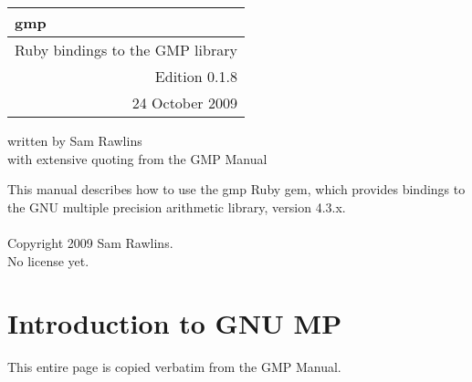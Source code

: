 \documentclass[pdftex,10pt]{article}
\newlength{\titrwidth}
\begin{document}
\begin{tabular}{p{1.0in} p{\titrwidth}}
\huge{gmp} &\\
\midrule[3pt]
\multicolumn{2}{r}{\large{Ruby bindings to the GMP library}}\\
\multicolumn{2}{r}{\large{Edition 0.1.8}}\\
\multicolumn{2}{r}{\large{24 October 2009}}
\end{tabular}

\vfill
\large{written by Sam Rawlins}\\
\large{with extensive quoting from the GMP Manual}
\newpage

\vfill
This manual describes how to use the gmp Ruby gem, which provides bindings to
the GNU multiple precision arithmetic library, version 4.3.x.\\
\\
Copyright 2009 Sam Rawlins.\\
No license yet.
\newpage

\tableofcontents
\newpage

\section{Introduction to GNU MP}

This entire page is copied verbatim from the GMP Manual.\\\\
\end{document}
